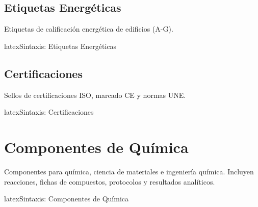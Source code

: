 \subsection{Etiquetas Energéticas}
\label{subsec:energia}

Etiquetas de calificación energética de edificios (A-G).

\begin{codigosimple}{latex}{Sintaxis: Etiquetas Energéticas}
\end{codigosimple}

\noindent
{} \quad
{} \quad
{} \quad
{} \quad
{} \quad
{} \quad
{}

\subsection{Certificaciones}
\label{subsec:certificaciones}

Sellos de certificaciones ISO, marcado CE y normas UNE.

\begin{codigosimple}{latex}{Sintaxis: Certificaciones}
\certce             %
\end{codigosimple}

\noindent
{} \quad {} \quad {}

\vspace{0.5em}
\noindent
\certce \quad {}


\section{Componentes de Química}
\label{sec:comp-quimica}

Componentes para química, ciencia de materiales e ingeniería química.
Incluyen reacciones, fichas de compuestos, protocolos y resultados analíticos.

\begin{codigosimple}{latex}{Sintaxis: Componentes de Química}
\usepackage[quimica]{eps-componentes}
\end{codigosimple}

